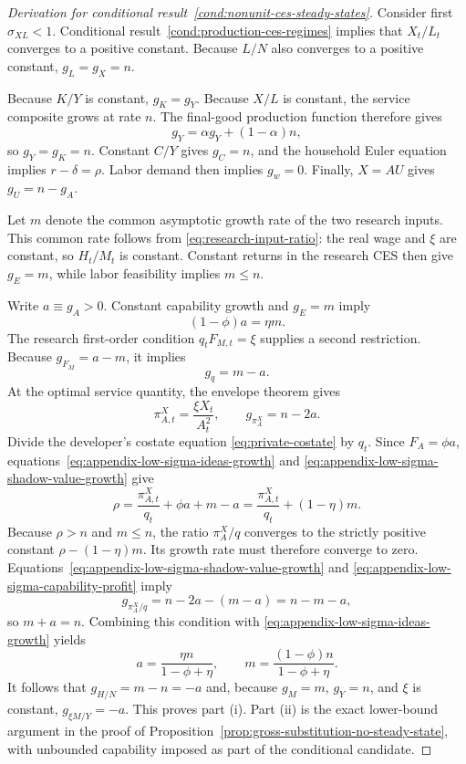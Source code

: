 \begin{proof}[Derivation for conditional result~\ref{cond:nonunit-ces-steady-states}]
Consider first $\sigma_{XL}<1$. Conditional result~\ref{cond:production-ces-regimes}
implies that $X_t/L_t$ converges to a positive constant. Because $L/N$ also
converges to a positive constant, $g_L=g_X=n$.

Because $K/Y$ is constant, $g_K=g_Y$. Because $X/L$ is constant, the service
composite grows at rate $n$. The final-good production function therefore gives
\[
    g_Y=\alpha g_Y+(1-\alpha)n,
\]
so $g_Y=g_K=n$. Constant $C/Y$ gives $g_C=n$, and the household Euler equation
implies $r-\delta=\rho$. Labor demand then implies $g_w=0$. Finally, $X=AU$ gives
$g_U=n-g_A$.

Let $m$ denote the common asymptotic growth rate of the two research inputs. This
common rate follows from \eqref{eq:research-input-ratio}: the real wage and $\xi$ are
constant, so $H_t/M_t$ is constant. Constant returns in the research CES then give
$g_E=m$, while labor feasibility implies $m\leq n$.

Write $a\equiv g_A>0$. Constant capability growth and $g_E=m$ imply
\begin{equation}
    (1-\phi)a=\eta m.
    \label{eq:appendix-low-sigma-ideas-growth}
\end{equation}
The research first-order condition $q_tF_{M,t}=\xi$ supplies a second restriction.
Because $g_{F_M}=a-m$, it implies
\begin{equation}
    g_q=m-a.
    \label{eq:appendix-low-sigma-shadow-value-growth}
\end{equation}
At the optimal service quantity, the envelope theorem gives
\begin{equation}
    \pi^X_{A,t}=\frac{\xi X_t}{A_t^2},
    \qquad
    g_{\pi^X_A}=n-2a.
    \label{eq:appendix-low-sigma-capability-profit}
\end{equation}
Divide the developer's costate equation \eqref{eq:private-costate} by $q_t$. Since
$F_A=\phi a$, equations~\eqref{eq:appendix-low-sigma-ideas-growth} and
\eqref{eq:appendix-low-sigma-shadow-value-growth} give
\begin{equation}
    \rho
    =
    \frac{\pi^X_{A,t}}{q_t}
    +\phi a+m-a
    =
    \frac{\pi^X_{A,t}}{q_t}+(1-\eta)m.
    \label{eq:appendix-low-sigma-costate-limit}
\end{equation}
Because $\rho>n$ and $m\leq n$, the ratio $\pi^X_A/q$ converges to the strictly
positive constant $\rho-(1-\eta)m$. Its growth rate must therefore converge to zero.
Equations~\eqref{eq:appendix-low-sigma-shadow-value-growth} and
\eqref{eq:appendix-low-sigma-capability-profit} imply
\[
    g_{\pi^X_A/q}=n-2a-(m-a)=n-m-a,
\]
so $m+a=n$. Combining this condition with
\eqref{eq:appendix-low-sigma-ideas-growth} yields
\[
    a=\frac{\eta n}{1-\phi+\eta},
    \qquad
    m=\frac{(1-\phi)n}{1-\phi+\eta}.
\]
It follows that $g_{H/N}=m-n=-a$ and, because $g_M=m$, $g_Y=n$, and $\xi$ is
constant, $g_{\xi M/Y}=-a$. This proves part (i). Part (ii) is
the exact lower-bound argument in the proof of
Proposition~\ref{prop:gross-substitution-no-steady-state}, with unbounded capability
imposed as part of the conditional candidate.
\end{proof}

